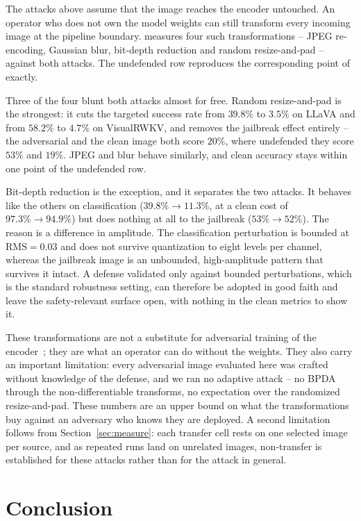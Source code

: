 \documentclass[conference]{IEEEtran}
\begin{document}
The attacks above assume that the image reaches the encoder untouched. An
operator who does not own the model weights can still transform every
incoming image at the pipeline boundary.  measures four
such transformations -- JPEG re-encoding, Gaussian blur, bit-depth
reduction and random resize-and-pad -- against both attacks. The undefended
row reproduces the corresponding point of  exactly.

Three of the four blunt both attacks almost for free. Random resize-and-pad
is the strongest: it cuts the targeted success rate from $39.8\%$ to
$3.5\%$ on LLaVA and from $58.2\%$ to $4.7\%$ on VisualRWKV, and removes
the jailbreak effect entirely -- the adversarial and the clean image both
score $20\%$, where undefended they score $53\%$ and $19\%$. JPEG and blur
behave similarly, and clean accuracy stays within one point of the
undefended row.

Bit-depth reduction is the exception, and it separates the two attacks. It
behaves like the others on classification ($39.8\%\to11.3\%$, at a clean
cost of $97.3\%\to94.9\%$) but does nothing at all to the jailbreak
($53\%\to52\%$). The reason is a difference
in amplitude. The classification perturbation is bounded at
$\mathrm{RMS}=0.03$ and does not survive quantization to eight levels per
channel, whereas the jailbreak image is an unbounded, high-amplitude
pattern that survives it intact. A defense validated only against bounded
perturbations, which is the standard robustness setting, can therefore be
adopted in good faith and leave the safety-relevant surface open, with
nothing in the clean metrics to show it.

These transformations are not a substitute for adversarial training of the
encoder~\cite{Madry2018AT}; they are what an operator can do without the
weights. They also carry an important limitation: every adversarial image
evaluated here was crafted without knowledge of the defense, and we ran no
adaptive attack -- no BPDA through the non-differentiable transforms, no
expectation over the randomized resize-and-pad. These numbers are an upper
bound on what the transformations buy against an adversary who knows they
are deployed. A second limitation follows from
Section~\ref{sec:measure}: each transfer cell rests on one selected image per
source, and as repeated runs land on unrelated images, non-transfer is
established for these attacks rather than for the attack in general.

\section{Conclusion}
\end{document}

